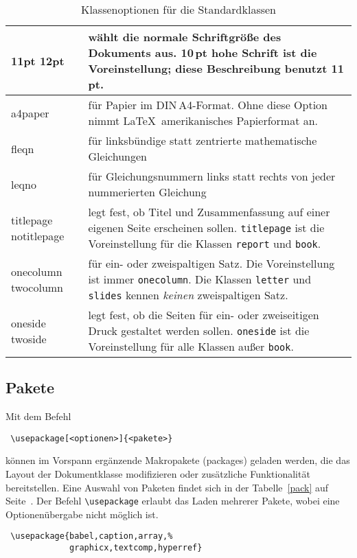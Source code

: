 \begin{table}[hbpt]
\small
\centering
\caption[Klassenoptionen]{Klassenoptionen für die Standardklassen} \label{options}
\renewcommand\arraystretch{1.5}
\begin{tabularx}{.95\linewidth}{@{}>{\raggedright\arraybackslash\ttfamily}p{2.2cm}X@{}}
\toprule
10pt 11pt  12pt & wählt die normale Schriftgröße des Dokuments aus.
  10\,pt hohe Schrift ist die Voreinstellung; diese Beschreibung benutzt 11\,pt. \\
\midrule
a4paper & für Papier im DIN\,A4-Format. Ohne diese
  Option nimmt \LaTeX\ amerikanisches Papierformat an. \\
\midrule
 fleqn & für linksbündige statt zentrierte mathematische   Gleichungen \\
\midrule
 leqno & für Gleichungsnummern links statt rechts von jeder   nummerierten Gleichung \\ 
\midrule
 titlepage  notitlepage & legt fest, ob Titel und Zusammenfassung
  auf einer eigenen Seite erscheinen sollen.  \texttt{titlepage} ist
  die Voreinstellung für die Klassen \texttt{report} und \texttt{book}. \\
\midrule
 onecolumn   twocolumn & für ein- oder zweispaltigen Satz.  Die Voreinstellung ist immer \texttt{onecolumn}.  
 Die Klassen \texttt{letter} und \texttt{slides} kennen \emph{keinen}  zweispaltigen Satz. \\
\midrule
 oneside   twoside & legt fest, ob die Seiten für ein- oder
  zweiseitigen  Druck gestaltet werden sollen.  
  \texttt{oneside} ist die Voreinstellung für
  alle Klassen außer \texttt{book}.
  \\
 \bottomrule
\end{tabularx}
\end{table}



\subsection{Pakete}\label{packages}
 
Mit dem Befehl
\begin{lstlisting}
 \usepackage[<optionen>]{<pakete>}
\end{lstlisting}
können im Vorspann ergänzende Makropakete (packages) geladen werden, die das 
Layout der Dokumentklasse modifizieren oder zusätzliche Funktionalität 
bereitstellen. Eine Auswahl von Paketen findet sich in der Tabelle~\ref{pack} 
auf Seite~\pageref{pack}. Der Befehl \lstinline+\usepackage+ erlaubt das Laden
mehrerer Pakete, wobei eine Optionenübergabe nicht möglich ist.
\begin{lstlisting}
 \usepackage{babel,caption,array,%
             graphicx,textcomp,hyperref}
\end{lstlisting}

